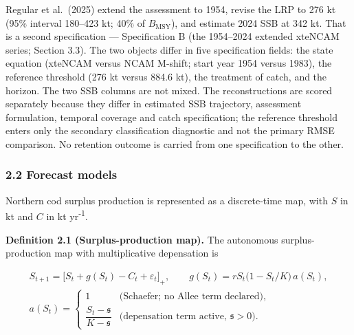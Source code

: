\documentclass[11pt]{article}
\begin{document}
Regular et al.~(2025) extend the assessment to 1954, revise the LRP to
276 kt (95\% interval 180--423 kt; 40\% of \(B_{\mathrm{MSY}}\)), and
estimate 2024 SSB at 342 kt. That is a second specification ---
Specification B (the 1954--2024 extended xteNCAM series; Section 3.3).
The two objects differ in five specification fields: the state equation
(xteNCAM versus NCAM M-shift; start year 1954 versus 1983), the
reference threshold (276 kt versus 884.6 kt), the treatment of catch,
and the horizon.
The two SSB columns are not mixed. The reconstructions are scored separately because they differ in
estimated SSB trajectory, assessment formulation, temporal coverage and
catch specification; the reference threshold enters only the secondary
classification diagnostic and not the primary RMSE comparison. No
retention outcome is carried from one specification to the other.

\subsubsection{2.2 Forecast models}\label{forecast-models}

Northern cod surplus production is represented as a discrete-time map,
with \(S\) in kt and \(C\) in kt yr\textsuperscript{-1}.

\textbf{Definition 2.1 (Surplus-production map).} The autonomous
surplus-production map with multiplicative depensation is

\[
\begin{gathered}
S_{t+1}=\bigl[S_t+g(S_t)-C_t+\varepsilon_t\bigr]_+,
\qquad
g(S_t)=rS_t\bigl(1-S_t/K\bigr)\,a(S_t),
\\
a(S_t)=
\begin{cases}
1 & \text{(Schaefer; no Allee term declared)},\\[2pt]
\dfrac{S_t-\mathfrak s}{K-\mathfrak s} & \text{(depensation term active, $\mathfrak s>0$)}.
\end{cases}
\end{gathered}
\]
\end{document}
